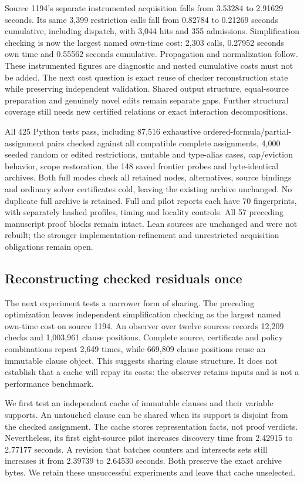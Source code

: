 \documentclass[11pt,a4paper]{article}
\numberwithin{equation}{section}
\theoremstyle{plain}
\theoremstyle{definition}
\theoremstyle{remark}
\begin{document}
Source 1194's separate instrumented acquisition falls from 3.53284 to 2.91629 seconds. Its same 3,399 restriction calls fall from 0.82784 to 0.21269 seconds cumulative, including dispatch, with 3,044 hits and 355 admissions. Simplification checking is now the largest named own-time cost: 2,303 calls, 0.27952 seconds own time and 0.55562 seconds cumulative. Propagation and normalization follow. These instrumented figures are diagnostic and nested cumulative costs must not be added. The next cost question is exact reuse of checker reconstruction state while preserving independent validation. Shared output structure, equal-source preparation and genuinely novel edits remain separate gaps. Further structural coverage still needs new certified relations or exact interaction decompositions.

All 425 Python tests pass, including 87,516 exhaustive ordered-formula/partial-assignment pairs checked against all compatible complete assignments, 4,000 seeded random or edited restrictions, mutable and type-alias cases, cap/eviction behavior, scope restoration, the 148 saved frontier probes and byte-identical archives. Both full modes check all retained nodes, alternatives, source bindings and ordinary solver certificates cold, leaving the existing archive unchanged. No duplicate full archive is retained. Full and pilot reports each have 70 fingerprints, with separately hashed profiles, timing and locality controls. All 57 preceding manuscript proof blocks remain intact. Lean sources are unchanged and were not rebuilt; the stronger implementation-refinement and unrestricted acquisition obligations remain open.

\subsection{Reconstructing checked residuals once}
\label{sec:single-pass-check}

The next experiment tests a narrower form of sharing. The preceding optimization leaves independent simplification checking as the largest named own-time cost on source 1194. An observer over twelve sources records 12,209 checks and 1,003,961 clause positions. Complete source, certificate and policy combinations repeat 2,649 times, while 669,809 clause positions reuse an immutable clause object. This suggests sharing clause structure. It does not establish that a cache will repay its costs: the observer retains inputs and is not a performance benchmark.

We first test an independent cache of immutable clauses and their variable supports. An untouched clause can be shared when its support is disjoint from the checked assignment. The cache stores representation facts, not proof verdicts. Nevertheless, its first eight-source pilot increases discovery time from 2.42915 to 2.77177 seconds. A revision that batches counters and intersects sets still increases it from 2.39739 to 2.64530 seconds. Both preserve the exact archive bytes. We retain these unsuccessful experiments and leave that cache unselected.
\end{document}
